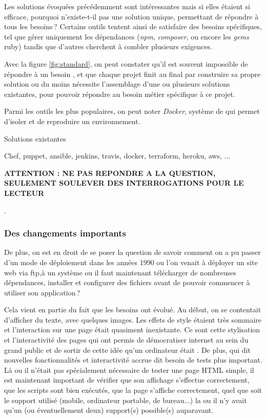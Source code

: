 Les solutions évoquées précédemment sont intéressantes mais si elles étaient si efficace, pourquoi n'existe-t-il pas une solution unique, permettant de répondre à tous les besoins ? Certains outils tentent ainsi de satisfaire des besoins spécifiques, tel que gérer uniquement les dépendances (\emph{npm}, \emph{composer}, ou encore les \emph{gems} ruby) tandis que d'autres cherchent à combler plusieurs exigences.


Avec la figure \ref{fig:standard}, on peut constater qu'il est souvent impossible de répondre à un besoin , et que chaque projet finit au final par construire sa propre solution ou du moins nécessite l'assemblage d'une ou plusieurs solutions existantes, pour pouvoir répondre au besoin métier spécifique à ce projet.

Parmi les outils les plus populaires, on peut noter \emph{Docker}, système de  qui permet d'isoler et de reproduire un environnement.

Solutions existantes

Chef, puppet, ansible, jenkins, travis, docker, terraform, heroku, aws, ...

\textbf{ATTENTION : NE PAS REPONDRE A LA QUESTION, SEULEMENT SOULEVER DES INTERROGATIONS POUR LE LECTEUR}

.

\subsubsection{Des changements importants}

De plus, on est en droit de se poser la question de savoir comment on a pu passer d'un mode de déploiement dans les années 1990 ou l'on venait à déployer un site web via \gls{ftp},à un système ou il faut maintenant télécharger de nombreuses dépendances, installer et configurer des fichiers avant de pouvoir commencer à utiliser son application ?

Cela vient en partie du fait que les besoins ont évolué. Au début, on se contentait d'afficher du texte, avec quelques images. Les effets de style étaient très sommaire et l'interaction sur une page était quasiment inexistante. Ce sont cette stylisation et l'interactivité des pages qui ont permis de démocratiser internet au sein du grand public et de sortir de cette idée qu'un ordinateur était . De plus, qui dit nouvelles fonctionnalités et interactivité accrue dit besoin de tests plus important. Là ou il n'était pas spécialement nécessaire de tester une page \gls{HTML} simple, il est maintenant important de vérifier que son affichage s'effectue correctement, que les scripts sont bien exécutés, que la page s'affiche correctement, quel que soit le support utilisé (mobile, ordinateur portable, de bureau...) la ou il n'y avait qu'un (ou éventuellement deux) support(s) possible(s) auparavant. 

